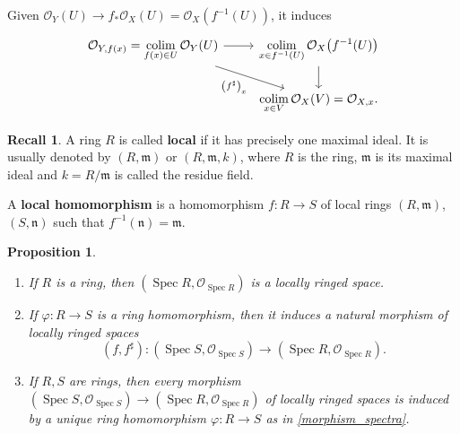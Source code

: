 \documentclass[12pt]{article}
\DeclareMathOperator{\Spec}{Spec}
\DeclareMathOperator*{\colim}{colim}
\newtheorem*{proposition}{Proposition}
\theoremstyle{definition}
\newtheorem*{recall}{Recall}
\theoremstyle{remark}
\begin{document}
Given $\mathcal{O}_Y(U)\rightarrow f_*\mathcal{O}_X(U)=\mathcal{O}_X(f^{-1}(U))$, it induces
\[
\begin{tikzcd}
\mathcal{O}_{Y,f(x)}=\displaystyle{\colim_{f(x)\in U}\mathcal{O}_Y(U)}\arrow[r]\arrow[rd,"\left(f^{\sharp}\right)_x",swap]&\displaystyle{\colim_{x\in f^{-1}(U)}\mathcal{O}_X\big(f^{-1}(U)\big)}\arrow[d]\\
&\displaystyle{\colim_{x\in V}\mathcal{O}_X(V)=\mathcal{O}_{X,x}.}
\end{tikzcd}
\]

\begin{recall}
A ring $R$ is called \textbf{local} if it has precisely one maximal ideal. It is usually denoted by $(R,\mathfrak{m})$ or $(R,\mathfrak{m},k)$, where $R$ is the ring, $\mathfrak{m}$ is its maximal ideal and $k=R/\mathfrak{m}$ is called the residue field.

A \textbf{local homomorphism} is a homomorphism $f:R\rightarrow S$ of local rings $(R,\mathfrak{m})$, $(S,\mathfrak{n})$ such that $f^{-1}(\mathfrak{n})=\mathfrak{m}$.
\end{recall}

\begin{proposition}
\begin{enumerate}[label=\arabic*)]
\item If $R$ is a ring, then $(\Spec R,\mathcal{O}_{\Spec R})$ is a locally ringed space.

\item\label{morphism_spectra} If $\varphi:R\rightarrow S$ is a ring homomorphism, then it induces a natural morphism of locally ringed spaces
\[(f,f^{\sharp}):(\Spec S,\mathcal{O}_{\Spec S})\longrightarrow(\Spec R,\mathcal{O}_{\Spec R}).\]

\item If $R,S$ are rings, then every morphism $(\Spec S,\mathcal{O}_{\Spec S})\rightarrow(\Spec R,\mathcal{O}_{\Spec R})$ of locally ringed spaces is induced by a unique ring homomorphism $\varphi:R\rightarrow S$ as in \ref{morphism_spectra}.
\end{enumerate}
\end{proposition}
\end{document}
